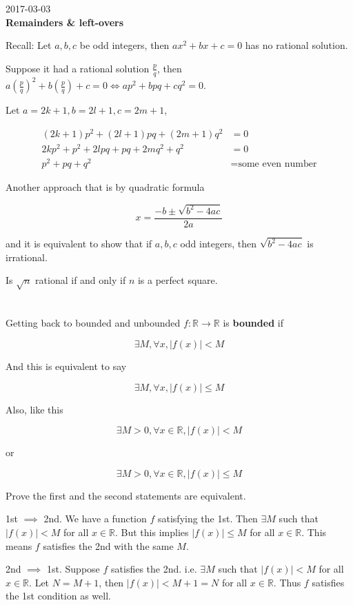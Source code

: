 \documentclass[a4paper, 11pt, twoside]{article}
\begin{document}
2017-03-03\\

\textbf{Remainders \& left-overs}

Recall: Let $a,b,c$ be odd integers, then $ax^2+bx+c=0$ has no rational solution.

Suppose it had a rational solution $\frac{p}{q}$, then $a\left(\frac{p}{q}\right)^2+b\left(\frac{p}{q}\right)+c=0 \iff ap^2+bpq+cq^2=0.$

Let $a=2k+1, b=2l+1, c=2m+1$,

\[
\begin{split}
	(2k+1)p^2+(2l+1)pq+(2m+1)q^2&=0\\
	2kp^2+p^2+2lpq+pq+2mq^2+q^2&=0 \\
	p^2+pq+q^2&=\text{some even number}
\end{split}
\]

Another approach that is by quadratic formula

\[x=\frac{-b\pm\sqrt{b^2-4ac}}{2a}\]

and it is equivalent to show that if $a,b,c$ odd integers, then $\sqrt{b^2-4ac}$ is irrational.

Is $\sqrt{n}$ rational if and only if $n$ is a perfect square.\\\\\\

Getting back to bounded and unbounded $f: \mathbb{R} \rightarrow \mathbb{R}$ is \textbf{bounded} if

\[\exists M, \forall x, |f(x)| < M\]

And this is equivalent to say

\[\exists M, \forall x, |f(x)| \leq M\]

Also, like this

\[\exists M > 0, \forall x \in \mathbb{R}, |f(x)| < M\]

or

\[\exists M > 0, \forall x \in \mathbb{R}, |f(x)| \leq M\]

Prove the first and the second statements are equivalent.

1st $\implies$ 2nd. We have a function $f$ satisfying the 1st. Then $\exists M$ such that $|f(x)|<M$ for all $x\in\mathbb{R}.$ But this implies $|f(x)|\leq M$ for all $x\in\mathbb{R}$. This means $f$ satisfies the 2nd with the same $M$.

2nd $\implies$ 1st. Suppose $f$ satisfies the 2nd. i.e. $\exists M$ such that $|f(x)|< M$ for all $x\in\mathbb{R}.$ Let $N=M+1$, then $|f(x)|<M+1=N$ for all $x\in\mathbb{R}.$ Thus $f$ satisfies the 1st condition as well.
\end{document}

